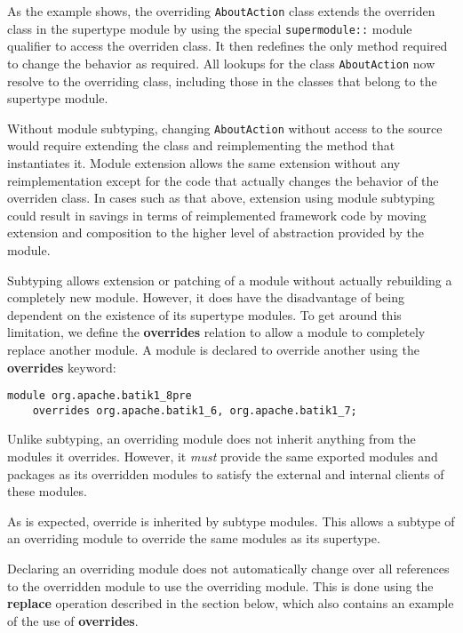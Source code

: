 As the example shows, the overriding \texttt{AboutAction} class extends the
overriden class in the supertype module by using the special 
\texttt{supermodule::} module qualifier to access the overriden class. It
then redefines the only method required to change the behavior as required.
All lookups for the class \texttt{AboutAction} now resolve to the overriding
class, including those in the classes that belong to the supertype module.

Without module subtyping, changing \texttt{AboutAction} without access to the source
would require extending the class and reimplementing the method 
that instantiates it. Module extension allows the same extension without
any reimplementation except for the code that actually changes the behavior of the overriden class.
In cases such as that above, extension using module subtyping could result in savings in
terms of reimplemented framework code by moving extension and
composition to the higher level of abstraction provided by the module.


Subtyping allows extension or patching of a module without actually
rebuilding a completely new module. However, it does have the disadvantage
of being dependent on the existence of its supertype modules. To get
around this limitation, we define the \textbf{overrides} relation to allow
a module to completely replace another module. A module is declared
to override another using the \textbf{overrides} keyword:

\begin{lstlisting}
module org.apache.batik1_8pre 
	overrides org.apache.batik1_6, org.apache.batik1_7;
\end{lstlisting}

Unlike subtyping, an overriding module does not inherit anything from the
modules it overrides. However, it \textit{must} provide the same exported modules
and packages as its overridden modules to satisfy the external and internal
clients of these modules.

As is expected, override is inherited by subtype modules. This allows a subtype
of an overriding module to override the same modules as its supertype.

Declaring an overriding module does not automatically change over all references
to the overridden module to use the overriding module. This is done using the
\textbf{replace} operation described in the section below, which also contains
an example of the use of \textbf{overrides}.

